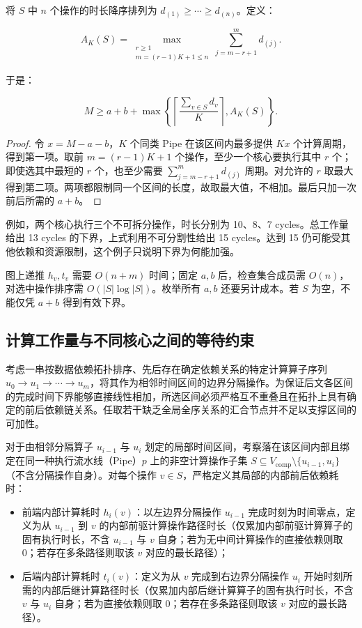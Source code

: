 \documentclass[anonymous,withtoc]{gmcm2026}
\providecommand{\tightlist}{\setlength{\itemsep}{0pt}\setlength{\parskip}{0pt}}
\begin{document}
将 \(S\) 中 \(n\) 个操作的时长降序排列为 \(d_{(1)} \ge \cdots \ge d_{(n)}\)。定义：

\begin{equation}
A_K(S) = \max_{\substack{r \ge 1 \\ m = (r-1)K+1 \le n}} \sum_{j=m-r+1}^{m} d_{(j)}.
\end{equation}

于是：

\begin{equation}
M \ge a + b + \max\left\{\left\lceil\frac{\sum_{v \in S} d_v}{K}\right\rceil, A_K(S)\right\}.
\end{equation}

\begin{proof} 令 \(x = M - a - b\)，\(K\) 个同类 Pipe 在该区间内最多提供 \(Kx\) 个计算周期，得到第一项。取前 \(m = (r-1)K + 1\) 个操作，至少一个核心要执行其中 \(r\) 个；即使选其中最短的 \(r\) 个，也至少需要 \(\sum_{j=m-r+1}^{m} d_{(j)}\) 周期。对允许的 \(r\) 取最大得到第二项。两项都限制同一个区间的长度，故取最大值，不相加。最后只加一次前后所需的 \(a + b\)。 \end{proof}

例如，两个核心执行三个不可拆分操作，时长分别为 10、8、7 cycles。总工作量给出 13 cycles 的下界，上式利用不可分割性给出 15 cycles。达到 15 仍可能受其他依赖和资源限制，这个例子只说明下界为何能加强。

图上递推 \(h_v, t_v\) 需要 \(O(n + m)\) 时间；固定 \(a, b\) 后，检查集合成员需 \(O(n)\)，对选中操作排序需 \(O(|S| \log |S|)\)。枚举所有 \(a, b\) 还要另计成本。若 \(S\) 为空，不能仅凭 \(a + b\) 得到有效下界。

\subsection{计算工作量与不同核心之间的等待约束}

考虑一串按数据依赖拓扑排序、先后存在确定依赖关系的特定计算算子序列 \(u_0 \to u_1 \to \cdots \to u_m\)，将其作为相邻时间区间的边界分隔操作。为保证后文各区间的完成时间下界能够直接线性相加，所选区间必须严格互不重叠且在拓扑上具有确定的前后依赖链关系。任取若干缺乏全局全序关系的汇合节点并不足以支撑区间的可加性。

对于由相邻分隔算子 \(u_{i-1}\) 与 \(u_i\) 划定的局部时间区间，考察落在该区间内部且绑定在同一种执行流水线（Pipe）\(p\) 上的非空计算操作子集 \(S \subseteq V_{\mathrm{comp}} \setminus \{u_{i-1}, u_i\}\)（不含分隔操作自身）。对每个操作 \(v \in S\)，严格定义其局部的内部前后依赖耗时：

\begin{itemize}
\tightlist
\item
  前端内部计算耗时 \(h_i(v)\)：以左边界分隔操作 \(u_{i-1}\) 完成时刻为时间零点，定义为从 \(u_{i-1}\) 到 \(v\) 的内部前驱计算操作路径时长（仅累加内部前驱计算算子的固有执行时长，不含 \(u_{i-1}\) 与 \(v\) 自身；若为无中间计算操作的直接依赖则取 0；若存在多条路径则取该 \(v\) 对应的最长路径）；
\item
  后端内部计算耗时 \(t_i(v)\)：定义为从 \(v\) 完成到右边界分隔操作 \(u_i\) 开始时刻所需的内部后继计算路径时长（仅累加内部后继计算算子的固有执行时长，不含 \(v\) 与 \(u_i\) 自身；若为直接依赖则取 0；若存在多条路径则取该 \(v\) 对应的最长路径）。
\end{itemize}
\end{document}
